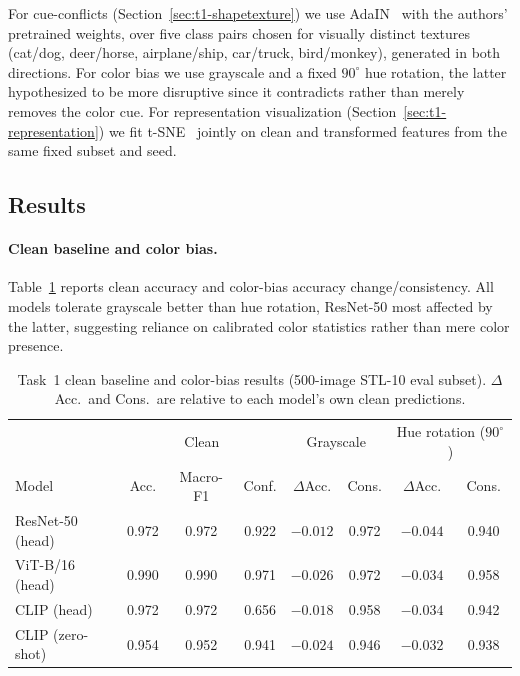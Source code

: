 \documentclass{article}
\begin{document}
For cue-conflicts (Section~\ref{sec:t1-shapetexture}) we use AdaIN~\citep{huang2017adain} with the authors' pretrained weights, over five class pairs chosen for visually distinct textures (cat/dog, deer/horse, airplane/ship, car/truck, bird/monkey), generated in both directions. For color bias we use grayscale and a fixed $90^\circ$ hue rotation, the latter hypothesized to be more disruptive since it contradicts rather than merely removes the color cue. For representation visualization (Section~\ref{sec:t1-representation}) we fit t-SNE~\citep{vandermaaten2008tsne} jointly on clean and transformed features from the same fixed subset and seed.

\subsection{Results}

\paragraph{Clean baseline and color bias.}
Table~\ref{tab:t1-clean-color} reports clean accuracy and color-bias accuracy change/consistency. All models tolerate grayscale better than hue rotation, ResNet-50 most affected by the latter, suggesting reliance on calibrated color statistics rather than mere color presence.

\begin{table}[t]
  \caption{Task~1 clean baseline and color-bias results (500-image STL-10 eval subset). $\Delta$Acc.\ and Cons.\ are relative to each model's own clean predictions.}
  \label{tab:t1-clean-color}
  \centering
  \footnotesize
  \begin{tabular}{lccc|cc|cc}
    \toprule
    & \multicolumn{3}{c|}{Clean} & \multicolumn{2}{c|}{Grayscale} & \multicolumn{2}{c}{Hue rotation ($90^\circ$)} \\
    Model & Acc. & Macro-F1 & Conf. & $\Delta$Acc. & Cons. & $\Delta$Acc. & Cons. \\
    \midrule
    ResNet-50 (head)      & 0.972 & 0.972 & 0.922 & $-0.012$ & 0.972 & $-0.044$ & 0.940 \\
    ViT-B/16 (head)       & 0.990 & 0.990 & 0.971 & $-0.026$ & 0.972 & $-0.034$ & 0.958 \\
    CLIP (head)           & 0.972 & 0.972 & 0.656 & $-0.018$ & 0.958 & $-0.034$ & 0.942 \\
    CLIP (zero-shot)      & 0.954 & 0.952 & 0.941 & $-0.024$ & 0.946 & $-0.032$ & 0.938 \\
    \bottomrule
  \end{tabular}
\end{table}
\end{document}
